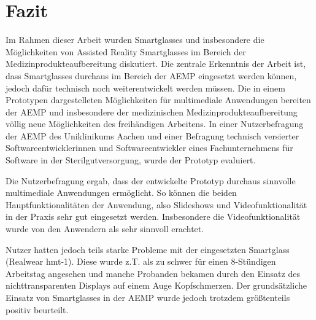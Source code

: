 %
%
%
%
%
%
\chapter{Fazit}
\label{ch:Fazit}

Im Rahmen dieser Arbeit wurden Smartglasses und insbesondere die Möglichkeiten von Assisted Reality Smartglasses im Bereich der Medizinprodukteaufbereitung diskutiert. Die zentrale Erkenntnis der Arbeit ist, dass Smartglasses durchaus im Bereich der AEMP eingesetzt werden können, jedoch dafür technisch noch weiterentwickelt werden müssen. Die in einem Prototypen dargestelleten Möglichkeiten für multimediale Anwendungen bereiten der AEMP und insbesondere der medizinischen Medizinprodukteaufbereitung völlig neue Möglichkeiten des freihändigen Arbeitens. In einer Nutzerbefragung der AEMP des Uniklinikums Aachen und einer Befragung technisch versierter  Softwareentwicklerinnen und Softwareentwickler eines Fachunternehmens für Software in der Sterilgutversorgung, wurde der Prototyp evaluiert.

Die Nutzerbefragung ergab, dass der entwickelte Prototyp durchaus sinnvolle multimediale Anwendungen ermöglicht. So können die beiden Hauptfunktionalitäten der Anwendung, also Slideshows und Videofunktionalität in der Praxis sehr gut eingesetzt werden. Insbesondere die Videofunktionalität wurde von den Anwendern als sehr sinnvoll erachtet. 

Nutzer hatten jedoch teils starke Probleme mit der eingesetzten Smartglass (Realwear hmt-1). Diese wurde z.T. als zu schwer für einen 8-Stündigen Arbeitstag angesehen und manche Probanden bekamen durch den Einsatz des nichttransparenten Displays auf einem Auge Kopfschmerzen. Der grundsätzliche Einsatz von Smartglasses in der AEMP wurde jedoch trotzdem größtenteils positiv beurteilt.
%
